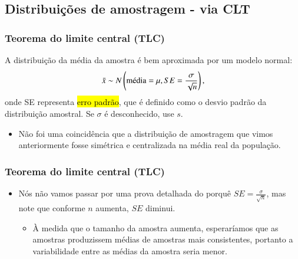 \subsection{Distribuições de amostragem - via CLT}


\begin{frame}
\frametitle{Teorema do limite central (TLC)}
\justifying
{}
{A distribuição da média da amostra é bem aproximada por um modelo normal:
\[ \bar{x} \sim N \left(  \text{média} = \mu, SE = \frac{\sigma}{\sqrt{n}}  \right), \]
onde SE representa \hl{erro padrão}, que é definido como o desvio padrão da distribuição amostral. Se $\sigma$ é desconhecido, use $s$.
}

\begin{itemize}
\justifying
\item Não foi uma coincidência que a distribuição de amostragem que vimos anteriormente fosse simétrica e centralizada na média real da população.
\end{itemize}
\end{frame}


\begin{frame}
\frametitle{Teorema do limite central (TLC)}
\begin{itemize}
\justifying
\item Nós não vamos passar por uma prova detalhada do porquê $SE =  \frac{\sigma}{\sqrt{n}}$, mas note que conforme $n$ aumenta, $SE$ diminui. 
\begin{itemize}
\justifying
\item À medida que o tamanho da amostra aumenta, esperaríamos que as amostras produzissem médias de amostras mais consistentes, portanto a variabilidade entre as médias da amostra seria menor.
\end{itemize}

\end{itemize}

\end{frame}



